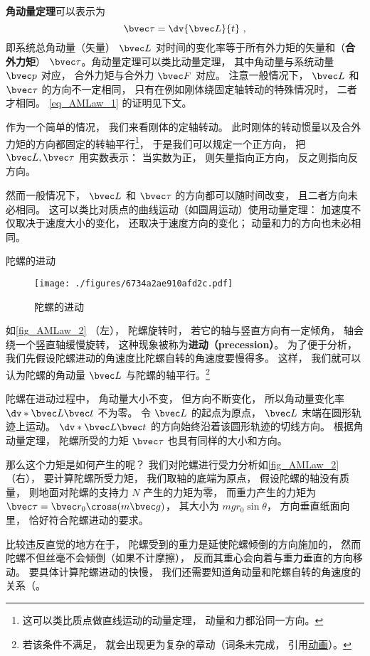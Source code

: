 
\textbf{角动量定理}可以表示为
\begin{equation}\label{eq_AMLaw_1}
\bvec \tau = \dv{\bvec L}{t}~,
\end{equation}
即系统总角动量（矢量） $\bvec L$ 对时间的变化率等于所有外力矩的矢量和（\textbf{合外力矩}） $\bvec \tau$。角动量定理可以类比动量定理， 其中角动量与系统动量 $\bvec p$ 对应， 合外力矩与合外力 $\bvec F$ 对应。 注意一般情况下， $\bvec L$ 和 $\bvec \tau$ 的方向不一定相同， 只有在例如刚体绕固定轴转动的特殊情况时， 二者才相同。 \autoref{eq_AMLaw_1} 的证明见下文。

作为一个简单的情况， 我们来看刚体的定轴转动。 此时刚体的转动惯量以及合外力矩的方向都固定的转轴平行\footnote{这可以类比质点做直线运动的动量定理， 动量和力都沿同一方向。}， 于是我们可以规定一个正方向， 把 $\bvec L, \bvec \tau$ 用实数表示： 当实数为正， 则矢量指向正方向， 反之则指向反方向。

然而一般情况下， $\bvec L$ 和 $\bvec \tau$ 的方向都可以随时间改变， 且二者方向未必相同。 这可以类比对质点的曲线运动（如圆周运动）使用动量定理： 加速度不仅取决于速度大小的变化， 还取决于速度方向的变化； 动量和力的方向也未必相同。
\begin{example}{陀螺的进动}\label{ex_AMLaw_2}
\begin{figure}[ht]
\centering
\texttt{[image: ./figures/6734a2ae910afd2c.pdf]}
\caption{陀螺的进动}\label{fig_AMLaw_2}
\end{figure}

如\autoref{fig_AMLaw_2} （左）， 陀螺旋转时， 若它的轴与竖直方向有一定倾角， 轴会绕一个竖直轴缓慢旋转， 这种现象被称为\textbf{进动（precession）}。 为了便于分析， 我们先假设陀螺进动的角速度比陀螺自转的角速度要慢得多。 这样， 我们就可以认为陀螺的角动量 $\bvec L$ 与陀螺的轴平行。\footnote{若该条件不满足， 就会出现更为复杂的章动（词条未完成， 引用\href{https://wuli.wiki/apps/Top.html}{动画}）。}

陀螺在进动过程中， 角动量大小不变， 但方向不断变化， 所以角动量变化率 $\dv*{\bvec L}{\bvec t}$ 不为零。 令 $\bvec L$ 的起点为原点， $\bvec L$ 末端在圆形轨迹上运动。 $\dv*{\bvec L}{\bvec t}$ 的方向始终沿着该圆形轨迹的切线方向。 根据角动量定理， 陀螺所受的力矩 $\bvec \tau$ 也具有同样的大小和方向。

那么这个力矩是如何产生的呢？ 我们对陀螺进行受力分析如\autoref{fig_AMLaw_2} （右）， 要计算陀螺所受力矩， 我们取轴的底端为原点， 假设陀螺的轴没有质量， 则地面对陀螺的支持力 $N$ 产生的力矩为零， 而重力产生的力矩为 $\bvec \tau = \bvec r_0 \cross (m\bvec g)$， 其大小为 $mgr_0\sin\theta$， 方向垂直纸面向里， 恰好符合陀螺进动的要求。

比较违反直觉的地方在于， 陀螺受到的重力是延使陀螺倾倒的方向施加的， 然而陀螺不但丝毫不会倾倒（如果不计摩擦）， 反而其重心会向着与重力垂直的方向移动。 要具体计算陀螺进动的快慢， 我们还需要知道角动量和陀螺自转的角速度的关系（。
\end{example}

